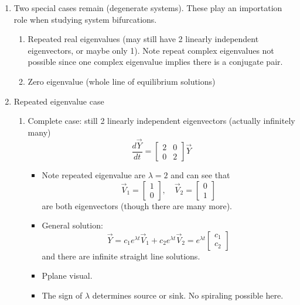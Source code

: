 \documentclass{article}
\begin{document}
\begin{enumerate}

\item Two special cases remain (degenerate systems). These play an importation role when studying system bifurcations.
\begin{enumerate}
\item Repeated real eigenvalues (may still have 2 linearly independent eigenvectors, or maybe only 1). Note repeat complex eigenvalues not possible since one complex eigenvalue implies there is a conjugate pair.
\item Zero eigenvalue (whole line of equilibrium solutions)
\end{enumerate}


\item Repeated eigenvalue case
\begin{enumerate}
\item Complete case: still 2 linearly independent eigenvectors (actually infinitely many)
\[
\frac{d\vec{Y}}{dt} = 
\begin{bmatrix}
2 & 0 \\
0 & 2
\end{bmatrix} \vec{Y}
\]
\begin{itemize}
\item Note repeated eigenvalue are $\lambda = 2$ and can see that 
\[
\vec{V}_1 = 
\begin{bmatrix}
1 \\ 0
\end{bmatrix},
\quad 
\vec{V}_2 = 
\begin{bmatrix}
0 \\ 1
\end{bmatrix} 
\]
are both eigenvectors (though there are many more).
\item General solution:
\[
\vec{Y} = c_1 e^{\lambda t} \vec{V}_1 + c_2 e^{\lambda t} \vec{V}_2 
= e^{\lambda t} \begin{bmatrix}
c_1 \\ c_2
\end{bmatrix}
\]
and there are infinite straight line solutions.
\item Pplane visual.
\item The sign of $\lambda$ determines source or sink. No spiraling possible here. 
\end{itemize}


\end{enumerate}
\end{enumerate}
\end{document}
